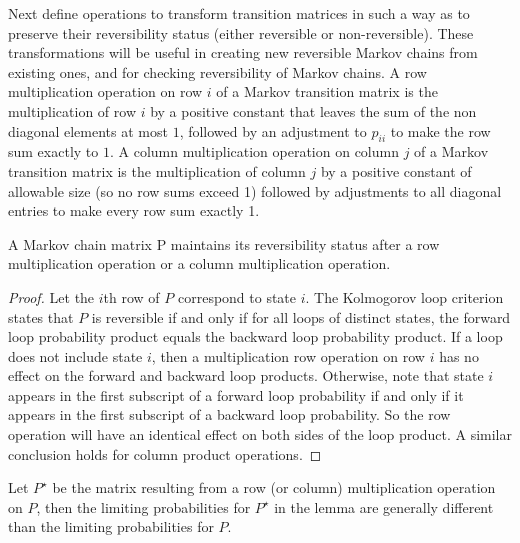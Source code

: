 \documentclass[12pt]{article}
\begin{document}
Next define operations to transform transition matrices in such a way as to
preserve their reversibility status (either reversible or
non-reversible). These
transformations will be useful in creating new reversible Markov chains from existing
ones, and for checking reversibility of Markov chains.
A row multiplication operation on row $i$ of a Markov transition
matrix is the multiplication of row $i$ by a positive constant that leaves the sum
of the non diagonal elements at most $1$, followed by an adjustment to $p_{ii}$ to make
the row sum exactly to $1$.
A column multiplication operation on column $j$ of a Markov transition matrix is the multiplication of column $j$ by a positive constant of allowable
size (so no row sums exceed 1) followed by adjustments to all diagonal entries to
make every row sum exactly 1.

\begin{lemma}
  A Markov chain matrix P maintains its reversibility status after
a row multiplication operation or a column multiplication operation.
\end{lemma}

\begin{proof}
  Let the $i$th row of $P$ correspond to state $i$. The Kolmogorov
  loop criterion states
that $P$ is reversible if and only if for all loops of distinct states, the forward loop probability
product equals the backward loop probability product. If a loop does not include
state $i$, then a multiplication row operation on row $i$ has no effect on
the forward
and backward loop products. Otherwise, note that state $i$ appears in the first
subscript of a forward loop probability if and only if it appears in the first subscript of a
backward loop probability. So the row operation will have an identical effect on
both sides of the loop product. A similar conclusion holds for column product
operations.
\end{proof}

\begin{remark}
  Let $P^{\star}$ be the matrix resulting from a row (or column) multiplication operation on $P$, then the limiting probabilities for $P^{\star}$ in the lemma
are generally different than the limiting probabilities for $P$. 
\end{remark}
\end{document}

